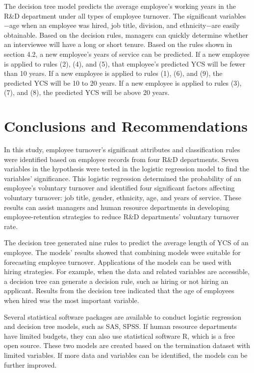 The decision tree model predicts the average employee's working years in the R\&D department under all types of employee turnover. The significant variables$-$age when an employee was hired, job title, division, and ethnicity$-$are easily obtainable. Based on the decision rules, managers can quickly determine whether an interviewee will have a long or short tenure. Based on the rules shown in section 4.2, a new employee's years of service can be predicted. If a new employee is applied to rules (2), (4), and (5), that employee's predicted YCS will be fewer than 10 years. If a new employee is applied to rules (1), (6), and (9), the predicted YCS will be 10 to 20 years. If a new employee is applied to rules (3), (7), and (8), the predicted YCS will be above 20 years.
\section{Conclusions and Recommendations}
In this study, employee turnover's significant attributes and classification rules were identified based on employee records from four R\&D departments. Seven variables in the hypothesis were tested in the logistic regression model to find the variables' significance. This logistic regression determined the probability of an employee's voluntary turnover and identified four significant factors affecting voluntary turnover: job title, gender, ethnicity, age, and years of service. These results can assist managers and human resource departments in developing employee-retention strategies to reduce R\&D departments' voluntary turnover rate.  
 
The decision tree generated nine rules to predict the average length of YCS of an employee. The models' results showed that combining models were suitable for forecasting employee turnover. Applications of the models can be used with hiring strategies. For example, when the data and related variables are accessible, a decision tree can generate a decision rule, such as hiring or not hiring an applicant. Results from the decision tree indicated that the age of employees when hired was the most important variable. 

Several statistical software packages are available to conduct logistic regression and decision tree models, such as SAS, SPSS. If human resource departments have limited budgets, they can also use statistical software R, which is a free open source. These two models are created based on the termination dataset with limited variables. If more data and variables can be identified, the models can be further improved. 



